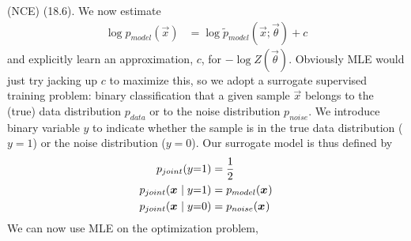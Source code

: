 \documentclass[11pt]{article}
\begin{document}
%
% 



\p {} (NCE) (18.6). We now estimate
\begin{align}
	\log p_{model}(\vec x)
		&= \log \tilde{p}_{model}(\vec x; \vec\theta) + c
\end{align}
and explicitly learn an approximation, $c$, for $-\log Z(\vec\theta)$. Obviously MLE would just try jacking up $c$ to maximize this, so we adopt a surrogate supervised training problem: binary classification that a given sample $\vec x$ belongs to the (true) data distribution $p_{data}$ or to the noise distribution $p_{noise}$. We introduce binary variable $y$ to indicate whether the sample is in the true data distribution ($y{=}1$) or the noise distribution ($y{=}0$). Our surrogate model is thus defined by
\begin{align}
	p_{joint}(y{=}1) &= \frac{1}{2} \\
	p_{joint}(\bm{x}_{} \mid y{=}1) &= p_{model}(\bm{x}_{}) \\
	p_{joint}(\bm{x}_{} \mid y{=}0) &= p_{noise}(\bm{x}_{}) 
\end{align}
We can now use MLE on the optimization problem,

































%
% 
\end{document}
